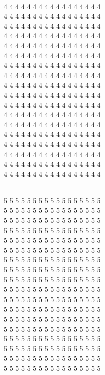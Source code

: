 \documentclass{article}
\begin{document}
\vspace{5mm}
\hspace{2mm} \\
4 4 4 4 4 4 4 4 4 4 4 4 4 4 4 4 4 \\
4 4 4 4 4 4 4 4 4 4 4 4 4 4 4 4 4 \\
4 4 4 4 4 4 4 4 4 4 4 4 4 4 4 4 4 \\
4 4 4 4 4 4 4 4 4 4 4 4 4 4 4 4 4 \\
4 4 4 4 4 4 4 4 4 4 4 4 4 4 4 4 4 \\
4 4 4 4 4 4 4 4 4 4 4 4 4 4 4 4 4 \\
4 4 4 4 4 4 4 4 4 4 4 4 4 4 4 4 4 \\
4 4 4 4 4 4 4 4 4 4 4 4 4 4 4 4 4 \\
4 4 4 4 4 4 4 4 4 4 4 4 4 4 4 4 4 \\
4 4 4 4 4 4 4 4 4 4 4 4 4 4 4 4 4 \\
4 4 4 4 4 4 4 4 4 4 4 4 4 4 4 4 4 \\
4 4 4 4 4 4 4 4 4 4 4 4 4 4 4 4 4 \\
4 4 4 4 4 4 4 4 4 4 4 4 4 4 4 4 4 \\
4 4 4 4 4 4 4 4 4 4 4 4 4 4 4 4 4 \\
4 4 4 4 4 4 4 4 4 4 4 4 4 4 4 4 4 \\
4 4 4 4 4 4 4 4 4 4 4 4 4 4 4 4 4 \\
4 4 4 4 4 4 4 4 4 4 4 4 4 4 4 4 4 \\
4 4 4 4 4 4 4 4 4 4 4 4 4 4 4 4 4 \\

\pagebreak

\vspace{5mm}
\hspace{2mm} \\
5 5 5 5 5 5 5 5 5 5 5 5 5 5 5 5 5 \\
5 5 5 5 5 5 5 5 5 5 5 5 5 5 5 5 5 \\
5 5 5 5 5 5 5 5 5 5 5 5 5 5 5 5 5 \\
5 5 5 5 5 5 5 5 5 5 5 5 5 5 5 5 5 \\
5 5 5 5 5 5 5 5 5 5 5 5 5 5 5 5 5 \\
5 5 5 5 5 5 5 5 5 5 5 5 5 5 5 5 5 \\
5 5 5 5 5 5 5 5 5 5 5 5 5 5 5 5 5 \\
5 5 5 5 5 5 5 5 5 5 5 5 5 5 5 5 5 \\
5 5 5 5 5 5 5 5 5 5 5 5 5 5 5 5 5 \\
5 5 5 5 5 5 5 5 5 5 5 5 5 5 5 5 5 \\
5 5 5 5 5 5 5 5 5 5 5 5 5 5 5 5 5 \\
5 5 5 5 5 5 5 5 5 5 5 5 5 5 5 5 5 \\
5 5 5 5 5 5 5 5 5 5 5 5 5 5 5 5 5 \\
5 5 5 5 5 5 5 5 5 5 5 5 5 5 5 5 5 \\
5 5 5 5 5 5 5 5 5 5 5 5 5 5 5 5 5 \\
5 5 5 5 5 5 5 5 5 5 5 5 5 5 5 5 5 \\
5 5 5 5 5 5 5 5 5 5 5 5 5 5 5 5 5 \\
5 5 5 5 5 5 5 5 5 5 5 5 5 5 5 5 5 \\
\end{document}
